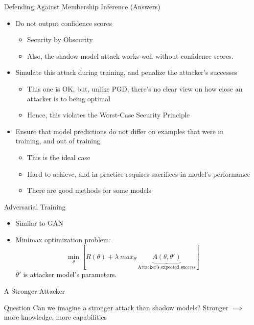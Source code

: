 \documentclass[10pt]{beamer}
\begin{document}
\begin{frame}{Defending Against Membership Inference (Answers)}
  \begin{itemize}[<+-| alert@+>]
    \item Do not output confidence scores
      \begin{itemize}
        \item Security by Obscurity
        \item Also, the shadow model attack works well without confidence scores.
      \end{itemize}
    \item Simulate this attack during training, and penalize the attacker's successes
      \begin{itemize}
        \item This one is OK, but, unlike PGD, there's no clear view on how close an attacker is to
            being optimal
        \item Hence, this violates the Worst-Case Security Principle
      \end{itemize}
    \item Ensure that model predictions do not differ on examples that were in training, and out of
        training
      \begin{itemize}
        \item This is the ideal case
        \item Hard to achieve, and in practice requires sacrifices in model's performance
        \item There are good methods for some models
      \end{itemize}
  \end{itemize}
\end{frame}

\begin{frame}{Adversarial Training}
  \begin{itemize}[<+-| alert@+>]
    \item Similar to GAN
    \item Minimax optimization problem:
      \[
        \min_{\theta} \left[ R(\theta) + \lambda\ max_{\theta'} \underbrace{A(\theta,
        \theta')}_{\text{Attacker's expected success}} \right]
      \]
    $\theta'$ is attacker model's parameters.
  \end{itemize}
\end{frame}

\begin{frame}{A Stronger Attacker}
  \begin{alertblock}{Question}
    Can we imagine a stronger attack than shadow models? Stronger $\implies$ more knowledge, more
    capabilities
  \end{alertblock}
\end{frame}
\end{document}
